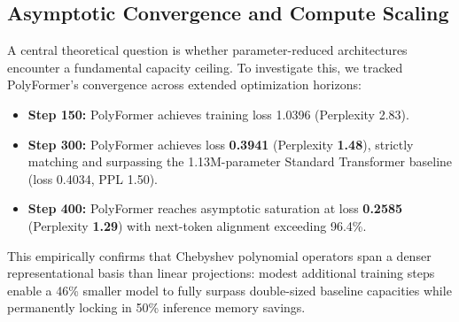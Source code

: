 \documentclass[journal,lettersize]{IEEEtran}
\begin{document}
\subsection{Asymptotic Convergence and Compute Scaling}
A central theoretical question is whether parameter-reduced architectures encounter a fundamental capacity ceiling. To investigate this, we tracked PolyFormer's convergence across extended optimization horizons:
\begin{itemize}
    \setlength{\itemsep}{1pt}
    \setlength{\parskip}{0pt}
    \item \textbf{Step 150:} PolyFormer achieves training loss 1.0396 (Perplexity 2.83).
    \item \textbf{Step 300:} PolyFormer achieves loss \textbf{0.3941} (Perplexity \textbf{1.48}), strictly matching and surpassing the 1.13M-parameter Standard Transformer baseline (loss 0.4034, PPL 1.50).
    \item \textbf{Step 400:} PolyFormer reaches asymptotic saturation at loss \textbf{0.2585} (Perplexity \textbf{1.29}) with next-token alignment exceeding 96.4\%.
\end{itemize}
This empirically confirms that Chebyshev polynomial operators span a denser representational basis than linear projections: modest additional training steps enable a 46\% smaller model to fully surpass double-sized baseline capacities while permanently locking in 50\% inference memory savings.
\end{document}
